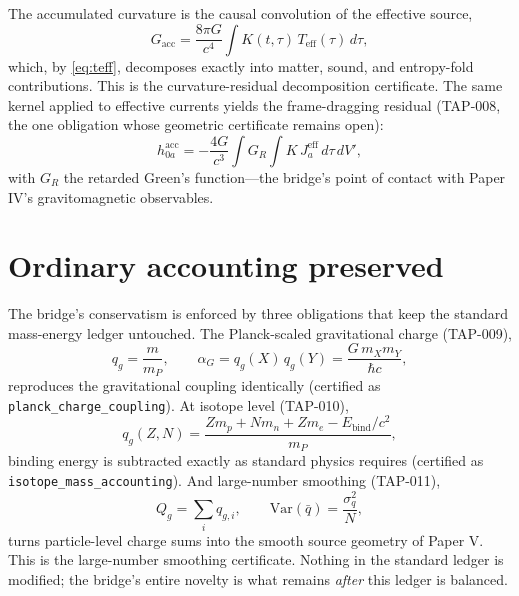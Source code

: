 \documentclass[11pt]{article}
\theoremstyle{remark}
\begin{document}
The accumulated curvature is the causal convolution of the effective source,
\begin{equation}
G_{\mathrm{acc}} = \frac{8\pi G}{c^4} \int K(t, \tau)\, T_{\mathrm{eff}}(\tau)\, d\tau,
\label{eq:gacc}
\end{equation}
which, by \eqref{eq:teff}, decomposes exactly into matter, sound, and entropy-fold contributions. This is the curvature-residual decomposition certificate. The same kernel applied to effective currents yields the frame-dragging residual (TAP-008, the one obligation whose geometric certificate remains open):
\begin{equation}
h^{\mathrm{acc}}_{0a} = -\frac{4G}{c^3} \int G_R \int K\, J^{\mathrm{eff}}_a\, d\tau\, dV',
\label{eq:framedrag}
\end{equation}
with $G_R$ the retarded Green's function---the bridge's point of contact with Paper IV's gravitomagnetic observables.

\section{Ordinary accounting preserved}
\label{sec:accounting}

The bridge's conservatism is enforced by three obligations that keep the standard mass-energy ledger untouched. The Planck-scaled gravitational charge (TAP-009),
\begin{equation}
q_g = \frac{m}{m_P}, \qquad \alpha_G = q_g(X)\, q_g(Y) = \frac{G\, m_X m_Y}{\hbar c},
\label{eq:charge}
\end{equation}
reproduces the gravitational coupling identically (certified as \texttt{planck\_charge\_coupling}). At isotope level (TAP-010),
\begin{equation}
q_g(Z, N) = \frac{Z m_p + N m_n + Z m_e - E_{\mathrm{bind}}/c^2}{m_P},
\label{eq:isotope}
\end{equation}
binding energy is subtracted exactly as standard physics requires (certified as \texttt{isotope\_mass\_accounting}). And large-number smoothing (TAP-011),
\begin{equation}
Q_g = \sum_i q_{g,i}, \qquad \mathrm{Var}(\bar{q}) = \frac{\sigma_q^2}{N},
\label{eq:smoothing}
\end{equation}
turns particle-level charge sums into the smooth source geometry of Paper V. This is the large-number smoothing certificate. Nothing in the standard ledger is modified; the bridge's entire novelty is what remains \emph{after} this ledger is balanced.
\end{document}
